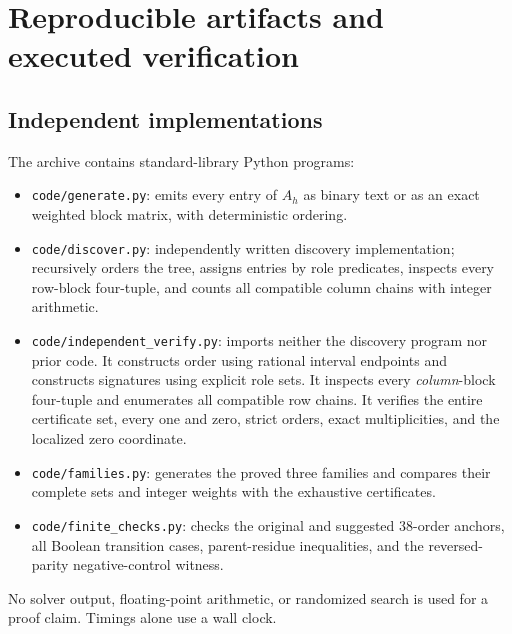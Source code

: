 \documentclass[11pt,a4paper]{article}
\theoremstyle{remark}
\begin{document}
\section{Reproducible artifacts and executed verification}
\label{sec:verification}

\subsection{Independent implementations}
The archive contains standard-library Python programs:
\begin{itemize}
\item \texttt{code/generate.py}: emits every entry of \(A_h\) as binary
text or as an exact weighted block matrix, with deterministic ordering.
\item \texttt{code/discover.py}: independently written discovery
implementation; recursively orders the tree, assigns entries by
role predicates, inspects every row-block four-tuple, and counts
all compatible column chains with integer arithmetic.
\item \texttt{code/independent\_verify.py}: imports neither the discovery
program nor prior code. It constructs order using rational interval
endpoints and constructs signatures using explicit role sets. It
inspects every \emph{column}-block four-tuple and enumerates all
compatible row chains. It verifies the entire certificate set,
every one and zero, strict orders, exact multiplicities, and the
localized zero coordinate.
\item \texttt{code/families.py}: generates the proved three families
and compares their complete sets and integer weights with the
exhaustive certificates.
\item \texttt{code/finite\_checks.py}: checks the original and suggested
38-order anchors, all Boolean transition cases, parent-residue
inequalities, and the reversed-parity negative-control witness.
\end{itemize}
No solver output, floating-point arithmetic, or randomized search is
used for a proof claim. Timings alone use a wall clock.
\end{document}
